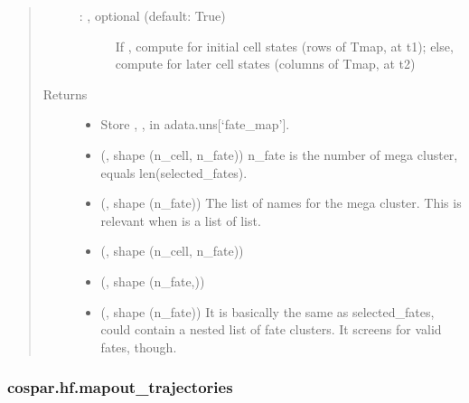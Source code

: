\documentclass[letterpaper,10pt,english]{sphinxmanual}
\begin{document}
\begin{fulllineitems}
\begin{quote}
\begin{description}
\begin{description}
\item[{ : , optional (default: True)}] \leavevmode
If , compute for initial cell states (rows of Tmap, at t1);
else, compute for later cell states (columns of Tmap, at t2)

\end{description}

\item[{Returns}] \leavevmode
\begin{itemize}
\item {} 
Store , ,  in adata.uns{[}‘fate\_map’{]}.

\item {} 
 (, shape (n\_cell, n\_fate)) \textendash{} n\_fate is the number of mega cluster, equals len(selected\_fates).

\item {} 
 (, shape (n\_fate)) \textendash{} The list of names for the mega cluster. This is relevant when
 is a list of list.

\item {} 
 (, shape (n\_cell, n\_fate))

\item {} 
 (, shape (n\_fate,))

\item {} 
 (, shape (n\_fate)) \textendash{} It is basically the same as selected\_fates, could contain a nested list
of fate clusters. It screens for valid fates, though.

\end{itemize}


\end{description}\end{quote}

\end{fulllineitems}



\subsubsection{cospar.hf.mapout\_trajectories}
\label{\detokenize{cospar.hf.mapout_trajectories:cospar-hf-mapout-trajectories}}\label{\detokenize{cospar.hf.mapout_trajectories::doc}}
\end{document}
